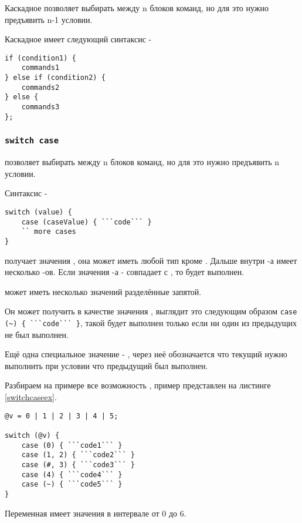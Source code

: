 Каскадное  позволяет выбирать между n блоков команд, но для это нужно предъявить n-1 условии.

Каскадное  имеет следующий синтаксис -
\begin{lstlisting}[numbers=none]
if (condition1) {
	commands1
} else if (condition2) {
	commands2
} else {
	commands3
};
\end{lstlisting}

\subsubsection{\lstinline|switch case|}

 позволяет выбирать между n блоков команд, но для это нужно предъявить n условии.

Синтаксис -
\begin{lstlisting}[numbers=none]
switch (value) {
	case (caseValue) { ```code``` }
	`` more cases
}
\end{lstlisting}

 получает значения , она может иметь любой тип кроме \bool. Дальше внутри -а имеет несколько -ов. Если значения -а -  совпадает с , то  будет выполнен.

 может иметь несколько значений разделённые запятой.

Он может получить в качестве значения \void, выглядит это следующим образом \lstinline|case (~) { ```code``` }|, такой  будет выполнен только если ни один из предыдущих не был выполнен.

Ещё одна специальное значение - \code{#}, через неё обозначается что текущий  нужно выполнить при условии что предыдущий был выполнен.

Разбираем на примере все возможность , пример представлен на листинге \ref{switchcaseex}.

\begin{lstlisting}[caption=Использование switch case, label=switchcaseex]
@v = 0 | 1 | 2 | 3 | 4 | 5;

switch (@v) {
	case (0) { ```code1``` }
	case (1, 2) { ```code2``` }
	case (#, 3) { ```code3``` }
	case (4) { ```code4``` }
	case (~) { ```code5``` }
}
\end{lstlisting}

Переменная  имеет значения в интервале от 0 до 6.

